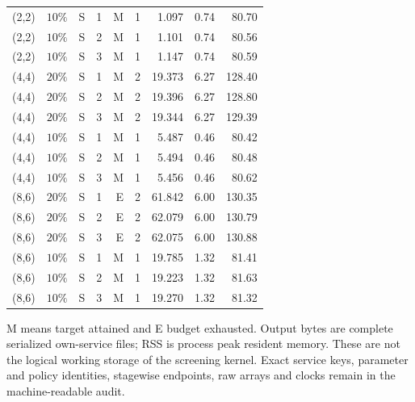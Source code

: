 \begin{longtable}{lrrrrrrrr}
(2,2) & $10\%$ & S & 1 & M & 1 & 1.097 & 0.74 & 80.70 \\
(2,2) & $10\%$ & S & 2 & M & 1 & 1.101 & 0.74 & 80.56 \\
(2,2) & $10\%$ & S & 3 & M & 1 & 1.147 & 0.74 & 80.59 \\
(4,4) & $20\%$ & S & 1 & M & 2 & 19.373 & 6.27 & 128.40 \\
(4,4) & $20\%$ & S & 2 & M & 2 & 19.396 & 6.27 & 128.80 \\
(4,4) & $20\%$ & S & 3 & M & 2 & 19.344 & 6.27 & 129.39 \\
(4,4) & $10\%$ & S & 1 & M & 1 & 5.487 & 0.46 & 80.42 \\
(4,4) & $10\%$ & S & 2 & M & 1 & 5.494 & 0.46 & 80.48 \\
(4,4) & $10\%$ & S & 3 & M & 1 & 5.456 & 0.46 & 80.62 \\
(8,6) & $20\%$ & S & 1 & E & 2 & 61.842 & 6.00 & 130.35 \\
(8,6) & $20\%$ & S & 2 & E & 2 & 62.079 & 6.00 & 130.79 \\
(8,6) & $20\%$ & S & 3 & E & 2 & 62.075 & 6.00 & 130.88 \\
(8,6) & $10\%$ & S & 1 & M & 1 & 19.785 & 1.32 & 81.41 \\
(8,6) & $10\%$ & S & 2 & M & 1 & 19.223 & 1.32 & 81.63 \\
(8,6) & $10\%$ & S & 3 & M & 1 & 19.270 & 1.32 & 81.32 \\
\hline\end{longtable}
\noindent M means target attained and E budget exhausted. Output bytes are complete serialized own-service files; RSS is process peak resident memory. These are not the logical working storage of the screening kernel. Exact service keys, parameter and policy identities, stagewise endpoints, raw arrays and clocks remain in the machine-readable audit.
\endgroup
